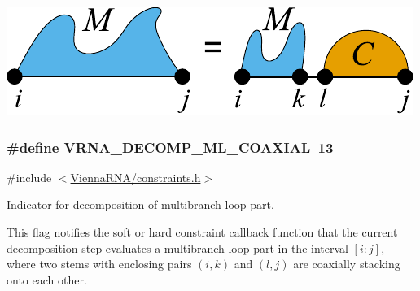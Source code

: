  
\begin{DoxyImageNoCaption}
  \mbox{\includegraphics[width=\textwidth,height=\textheight/2,keepaspectratio=true]{decomp_ml_ml_stem}}
\end{DoxyImageNoCaption}
 \hypertarget{group__constraints_ga4fe48d575830b16c208e280e01ab1497}{}
\subsubsection[{V\+R\+N\+A\+\_\+\+D\+E\+C\+O\+M\+P\+\_\+\+M\+L\+\_\+\+C\+O\+A\+X\+I\+A\+L}]{\setlength{\rightskip}{0pt plus 5cm}\#define V\+R\+N\+A\+\_\+\+D\+E\+C\+O\+M\+P\+\_\+\+M\+L\+\_\+\+C\+O\+A\+X\+I\+A\+L~13}\label{group__constraints_ga4fe48d575830b16c208e280e01ab1497}


{\ttfamily \#include $<$\hyperlink{constraints_8h}{Vienna\+R\+N\+A/constraints.\+h}$>$}



Indicator for decomposition of multibranch loop part. 

This flag notifies the soft or hard constraint callback function that the current decomposition step evaluates a multibranch loop part in the interval $[i:j]$, where two stems with enclosing pairs $(i,k)$ and $(l,j)$ are coaxially stacking onto each other.

